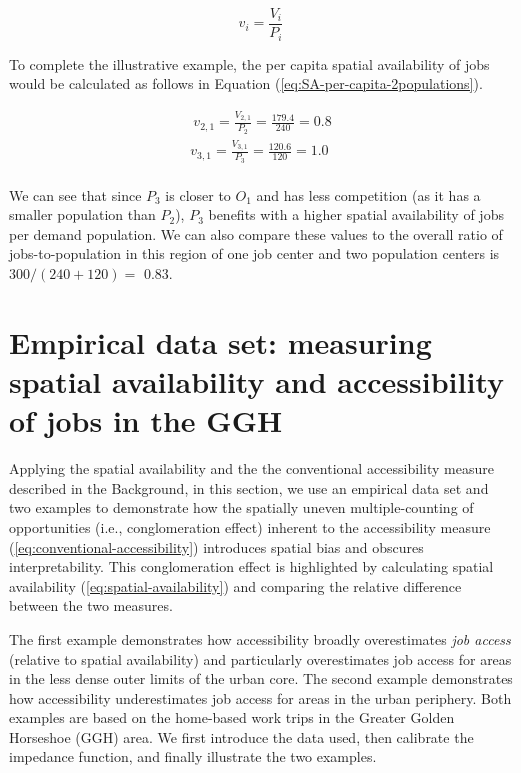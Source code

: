 \documentclass[]{elsarticle} %
\begin{document}
\begin{equation}
\label{eq:SA-per-capita}
v_i = \frac{V_i}{P_i}
\end{equation}

To complete the illustrative example, the per capita spatial
availability of jobs would be calculated as follows in Equation
(\ref{eq:SA-per-capita-2populations}).

\begin{equation}
\label{eq:SA-per-capita-2populations}
\begin{array}{l}\
v_{2,1} = \frac{V_{2,1}}{P_2} =  \frac{179.4}{240} = 0.8\\
v_{3,1} =  \frac{V_{3,1}}{P_3} =  \frac{120.6}{120} = 1.0\\
\end{array}
\end{equation}

We can see that since \(P_3\) is closer to \(O_1\) and has less
competition (as it has a smaller population than \(P_2\)), \(P_3\)
benefits with a higher spatial availability of jobs per demand
population. We can also compare these values to the overall ratio of
jobs-to-population in this region of one job center and two population
centers is \(300/(240 + 120)=\) 0.83.

\hypertarget{empirical-data-set-measuring-spatial-availability-and-accessibility-of-jobs-in-the-ggh}{%
\section{Empirical data set: measuring spatial availability and
accessibility of jobs in the
GGH}\label{empirical-data-set-measuring-spatial-availability-and-accessibility-of-jobs-in-the-ggh}}

Applying the spatial availability and the the conventional accessibility
measure described in the \protect\hypertarget{background}{}{Background},
in this section, we use an empirical data set and two examples to
demonstrate how the spatially uneven multiple-counting of opportunities
(i.e., conglomeration effect) inherent to the accessibility measure
(\ref{eq:conventional-accessibility}) introduces spatial bias and
obscures interpretability. This conglomeration effect is highlighted by
calculating spatial availability (\ref{eq:spatial-availability}) and
comparing the relative difference between the two measures.

The first example demonstrates how accessibility broadly overestimates
\emph{job access} (relative to spatial availability) and particularly
overestimates job access for areas in the less dense outer limits of the
urban core. The second example demonstrates how accessibility
underestimates job access for areas in the urban periphery. Both
examples are based on the home-based work trips in the Greater Golden
Horseshoe (GGH) area. We first introduce the data used, then calibrate
the impedance function, and finally illustrate the two examples.
\end{document}
